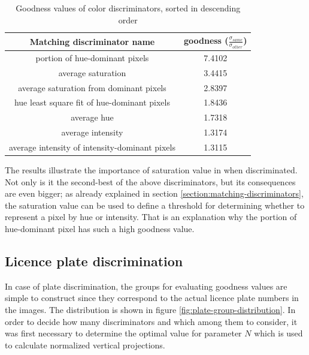 \documentclass[times, utf8, zavrsni]{fer}
\begin{document}
\begin{table}[h]
\begin{center} {\footnotesize
\begin{tabular}{c|c}
Matching discriminator name & goodness
($\frac{\sigma_{same}}{\sigma_{other}}$) \\
\hline
portion of hue-dominant pixels                   &    7.4102 \\
average saturation                               &    3.4415 \\
average saturation from dominant pixels          &    2.8397 \\
hue least square fit of hue-dominant pixels      &    1.8436 \\
average hue                                      &    1.7318 \\
average intensity                                &    1.3174 \\
average intensity of intensity-dominant pixels   &    1.3115 \\                 
\end{tabular} }
\end{center}
\caption{\footnotesize Goodness values of color discriminators, sorted in
descending order}
\label{table:color-discriminators-goodnesses}
\end{table}

The results illustrate the importance of saturation value in when discriminated.
Not only is it the second-best of the above discriminators, but its consequences
are even bigger; as already explained in section
\ref{section:matching-discriminators}, the saturation value can be used to
define a threshold for determining whether to represent a pixel by hue or
intensity. That is an explanation why the portion of hue-dominant
pixel has such a high goodness value.

\subsection{Licence plate discrimination}

In case of plate discrimination, the groups for evaluating goodness values are
simple to construct since they correspond to the actual licence plate numbers in
the images. The distribution is shown in figure
\ref{fig:plate-group-distribution}. In order to decide how many discriminators
and which among them to consider, it was first necessary to determine the
optimal value for parameter $N$ which is used to calculate normalized vertical
projections.
\end{document}
